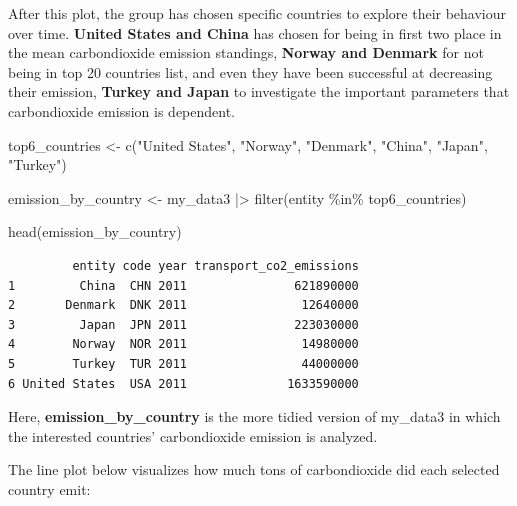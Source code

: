 \documentclass[
  11pt,
  a4paper,
  DIV=11,
  numbers=noendperiod]{scrartcl}
\newenvironment{Shaded}{\begin{snugshade}}{\end{snugshade}}
\newcommand{\FunctionTok}[1]{\textcolor[rgb]{0.28,0.35,0.67}{#1}}
\newcommand{\NormalTok}[1]{\textcolor[rgb]{0.00,0.23,0.31}{#1}}
\newcommand{\OtherTok}[1]{\textcolor[rgb]{0.00,0.23,0.31}{#1}}
\newcommand{\SpecialCharTok}[1]{\textcolor[rgb]{0.37,0.37,0.37}{#1}}
\newcommand{\StringTok}[1]{\textcolor[rgb]{0.13,0.47,0.30}{#1}}
\begin{document}
After this plot, the group has chosen specific countries to explore
their behaviour over time. \textbf{United States and China} has chosen
for being in first two place in the mean carbondioxide emission
standings, \textbf{Norway and Denmark} for not being in top 20 countries
list, and even they have been successful at decreasing their emission,
\textbf{Turkey and Japan} to investigate the important parameters that
carbondioxide emission is dependent.

\begin{Shaded}
\begin{Highlighting}[]
\NormalTok{top6\_countries }\OtherTok{\textless{}{-}} \FunctionTok{c}\NormalTok{(}\StringTok{"United States"}\NormalTok{, }\StringTok{"Norway"}\NormalTok{, }\StringTok{"Denmark"}\NormalTok{, }\StringTok{"China"}\NormalTok{, }\StringTok{"Japan"}\NormalTok{,}
                    \StringTok{"Turkey"}\NormalTok{)}

\NormalTok{emission\_by\_country }\OtherTok{\textless{}{-}}\NormalTok{ my\_data3 }\SpecialCharTok{|\textgreater{}}
  \FunctionTok{filter}\NormalTok{(entity }\SpecialCharTok{\%in\%}\NormalTok{ top6\_countries)}

\FunctionTok{head}\NormalTok{(emission\_by\_country)}
\end{Highlighting}
\end{Shaded}

\begin{verbatim}
         entity code year transport_co2_emissions
1         China  CHN 2011               621890000
2       Denmark  DNK 2011                12640000
3         Japan  JPN 2011               223030000
4        Norway  NOR 2011                14980000
5        Turkey  TUR 2011                44000000
6 United States  USA 2011              1633590000
\end{verbatim}

Here, \textbf{emission\_by\_country} is the more tidied version of
my\_data3 in which the interested countries' carbondioxide emission is
analyzed.

The line plot below visualizes how much tons of carbondioxide did each
selected country emit:
\end{document}
